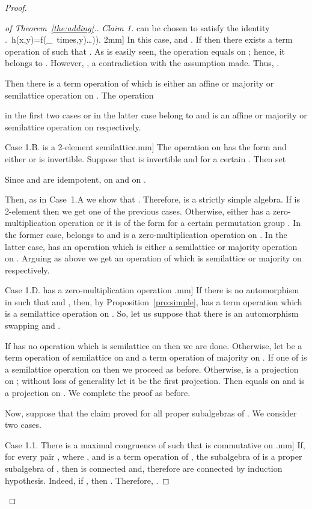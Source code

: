 \documentclass[11pt]{article}
\begin{document}
\begin{proof}
\begin{proof}[of Theorem~\ref{the:adding}.]
\noindent
{\em Claim 1.}  can be chosen to satisfy the identity
.\
h(x,y)=f(_{\mbox{\footnotesize 
times}},y)\ldots)).
2mm]
In this case,  and . If 
 then there exists a term operation  of
 such that . As is easily seen, the
operation  equals  on
; hence, it belongs to
. However, , a contradiction with
the assumption made. Thus, . 

Then there is a term operation  of  which is either an affine 
or majority or semilattice operation on . The operation
 
in the first two cases or
 in the latter case belong to  and is an
affine or majority or semilattice operation on  respectively.
\medskip

\noindent
{\sc Case 1.B.}  is a 2-element
semilattice.\2mm] 
The operation  on  has the form 
and either  or  is invertible. Suppose that  is invertible
and  for a certain . Then set 

Since  and  are idempotent,  on  and
 on . 

Then, as in Case~1.A we show that
. Therefore,  is a
strictly simple algebra. If  is 2-element then we get one of the
previous cases. Otherwise,  either has a zero-multiplication
operation  or it is of the form  for a certain
permutation group . In the former case,  belongs
to  and is a zero-multiplication operation on . In the latter 
case,  has an operation which is either a semilattice or majority 
operation on . Arguing as above we get an operation of
 which is semilattice or majority on  respectively.
\medskip

\noindent
{\sc Case 1.D.}  has a zero-multiplication
operation .\2mm] 
If there is no automorphism  in  such that  and
, then, by Proposition~\ref{pro:simple},  has a term
operation  which is a semilattice operation on . So, let
us suppose that there is an automorphism swapping  and . 

If  has no
operation which is semilattice on  then we are
done. Otherwise, let  be a term operation of  semilattice on
 and  a term operation of  majority on
. If one of  is a semilattice
operation on  then we proceed as before. Otherwise,  is a
projection on ; without loss of generality let it be the first
projection. Then  equals  on 
 and is a projection on . We complete the proof as
before. 
\medskip

Now, suppose that the claim proved for all proper subalgebras of
. We consider two cases.
\medskip

\noindent
{\sc Case 1.1.} There is a maximal congruence  of
 such that  is commutative on .\2mm]
If, for every pair , where , and  is a term operation of ,
the subalgebra  of  is a
proper subalgebra of 
, then  is connected and, therefore  are connected 
by induction hypothesis. Indeed, if
, then
. Therefore,
.


\end{proof}
\end{proof}
\end{document}
